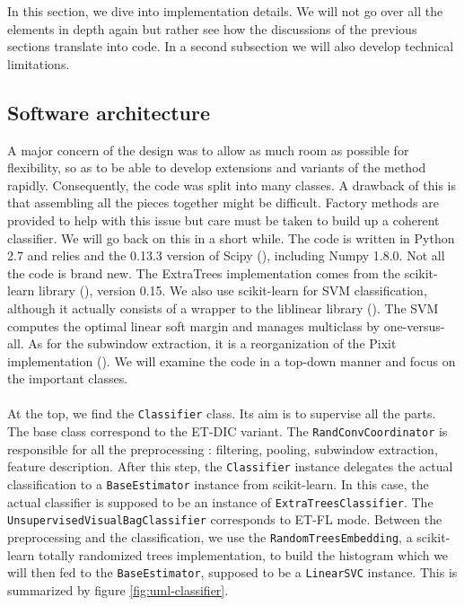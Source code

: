 \documentclass[a4paper]{report}
\begin{document}
	In this section, we dive into implementation details. We will not go over all the elements in depth again but rather see how the discussions of the previous sections translate into code. In a second subsection we will also develop technical limitations.
		\subsection{Software architecture}
		A major concern of the design was to allow as much room as possible for flexibility, so as to be able to develop extensions and variants of the method rapidly. Consequently, the code was split into many classes. A drawback of this is that assembling all the pieces together might be difficult. Factory methods are provided to help with this issue but care must be taken to build up a coherent classifier. We will go back on this in a short while. 
		The code is written in Python 2.7 and relies and the 0.13.3 version of Scipy (\cite{scipy}), including Numpy 1.8.0. Not all the code is brand new. The ExtraTrees implementation comes from the scikit-learn library (\cite{sklearn}), version 0.15. We also use scikit-learn for SVM classification, although it actually consists of a wrapper to the liblinear library (\cite{base}). The SVM computes the optimal linear soft margin and manages multiclass by one-versus-all.
				As for the subwindow extraction, it is a reorganization of the Pixit implementation (\cite{base}).
		We will examine the code in a top-down manner and focus on the important classes.
		\paragraph{}
		At the top, we find the \texttt{Classifier} class. Its aim is to supervise all the parts. The base class correspond to the ET-DIC variant. The \texttt{RandConvCoordinator} is responsible for all the preprocessing : filtering, pooling, subwindow extraction, feature description. After this step, the \texttt{Classifier} instance delegates the actual classification to a \texttt{BaseEstimator} instance from scikit-learn. In this case, the actual classifier is supposed to be an instance of \texttt{ExtraTreesClassifier}. The \texttt{UnsupervisedVisualBagClassifier} corresponds to ET-FL mode. Between the preprocessing and the classification, we use the \texttt{RandomTreesEmbedding}, a scikit-learn totally randomized trees implementation, to build the histogram which we will then fed to the \texttt{BaseEstimator}, supposed to be a \texttt{LinearSVC} instance.
		This is summarized by figure \ref{fig:uml-classifier}.
		
\end{document}

